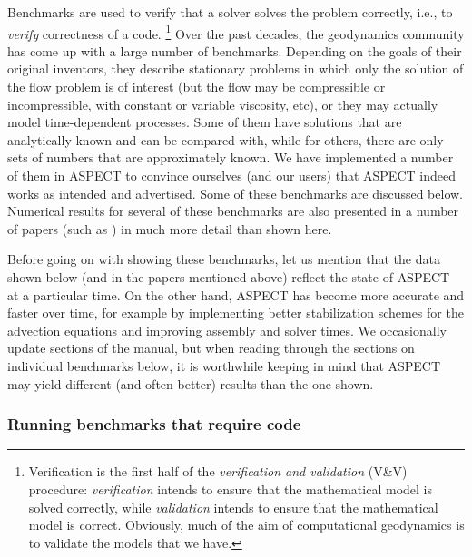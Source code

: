 \documentclass{article}
\newcommand{\aspect}{\textsc{ASPECT}}
\begin{document}
Benchmarks are used to verify that a solver solves the problem correctly,
i.e., to \textit{verify} correctness of a code.%
\footnote{Verification is the first half of the \textit{verification and
    validation} (V\&V) procedure: \textit{verification} intends to ensure that the
  mathematical model is solved correctly, while \textit{validation} intends to
  ensure that the mathematical model is correct. Obviously, much of the aim of
  computational geodynamics is to validate the models that we have.}
Over the past decades, the geodynamics community has come up with a large
number of benchmarks. Depending on the goals of their original inventors, they
describe stationary problems in which only the solution of the flow problem is
of interest (but the flow may be compressible or incompressible, with constant
or variable viscosity, etc), or they may actually model time-dependent
processes. Some of them have solutions that are analytically known and can be
compared with, while for others, there are only sets of numbers that are
approximately known. We have implemented a number of them in \aspect{} to
convince ourselves (and our users) that \aspect{} indeed works as intended and
advertised. Some of these benchmarks are discussed below. Numerical results
for several of these benchmarks are also presented in a number of
papers (such as \cite{KHB12,heister_aspect_methods2,T15,FBTGS19}) in much more
detail than shown here.

Before going on with showing these benchmarks, let us mention that the
data shown below (and in the papers mentioned above) reflect the state
of \aspect{} at a particular time. On the other hand, \aspect{} has
become more accurate and faster over time, for example by implementing
better stabilization schemes for the advection equations and improving
assembly and solver times. We occasionally update sections of the
manual, but when reading through the sections on individual benchmarks
below, it is worthwhile keeping in mind that \aspect{} may yield
different (and often better) results than the one shown.


\subsubsection{Running benchmarks that require code}
\label{sec:benchmark-run}
\end{document}
